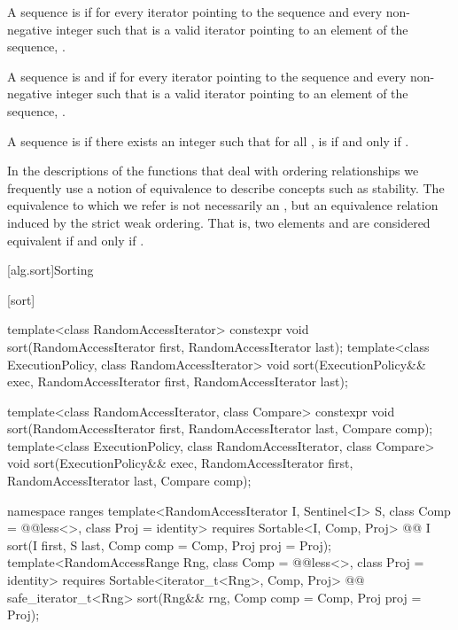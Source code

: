 \pnum
A sequence is
 if for every iterator
pointing to the sequence and every non-negative integer
such that
is a valid iterator pointing to an element of the sequence,
.

\begin{addedblock}
\pnum
A sequence is
 and  if for every iterator
pointing to the sequence and every non-negative integer
such that
is a valid iterator pointing to an element of the sequence,
.
\end{addedblock}

\pnum
A sequence
is
if there exists an integer
such that for all
,
is  if and only if
.

\pnum
In the descriptions of the functions that deal with ordering relationships we frequently use a notion of
equivalence to describe concepts such as stability.
The equivalence to which we refer is not necessarily an
,
but an equivalence relation induced by the strict weak ordering.
That is, two elements
and
are considered equivalent if and only if
.

[alg.sort]{Sorting}

[sort]{}

%
\begin{itemdecl}
template<class RandomAccessIterator>
  constexpr void sort(RandomAccessIterator first, RandomAccessIterator last);
template<class ExecutionPolicy, class RandomAccessIterator>
  void sort(ExecutionPolicy&& exec,
            RandomAccessIterator first, RandomAccessIterator last);

template<class RandomAccessIterator, class Compare>
  constexpr void sort(RandomAccessIterator first, RandomAccessIterator last,
            Compare comp);
template<class ExecutionPolicy, class RandomAccessIterator, class Compare>
  void sort(ExecutionPolicy&& exec,
            RandomAccessIterator first, RandomAccessIterator last,
            Compare comp);
\end{itemdecl}
\begin{addedblock}
\begin{itemdecl}
namespace ranges {
  template<RandomAccessIterator I, Sentinel<I> S, class Comp = @@less<>,
      class Proj = identity>
    requires Sortable<I, Comp, Proj>
    @@ I
      sort(I first, S last, Comp comp = Comp{}, Proj proj = Proj{});
  template<RandomAccessRange Rng, class Comp = @@less<>, class Proj = identity>
    requires Sortable<iterator_t<Rng>, Comp, Proj>
    @@ safe_iterator_t<Rng>
      sort(Rng&& rng, Comp comp = Comp{}, Proj proj = Proj{});
}
\end{itemdecl}
\end{addedblock}

